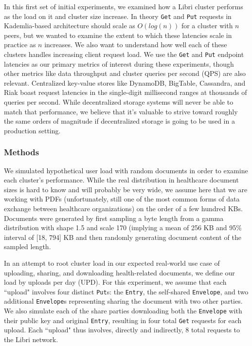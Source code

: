 \documentclass[10pt]{article}
\newcommand{\ttt}[1]{\texttt{#1}}
\def\Entry{\ttt{Entry}}
\def\Envelope{\ttt{Envelope}}
\begin{document}
In this first set of initial experiments, we examined how a Libri cluster performs as the load on it and cluster size increase. In theory \ttt{Get} and \texttt{Put} requests in Kademlia-based architecture should scale as $O(log(n))$ for a cluster with $n$ peers, but we wanted to examine the extent to which these latencies scale in practice as $n$ increases. We also want to understand how well each of these clusters handles increasing client request load. We use the \texttt{Get} and \texttt{Put} endpoint latencies as our primary metrics of interest during these experiments, though other metrics like data throughput and cluster queries per second (QPS) are also relevant. Centralized key-value stores like DynamoDB, BigTable, Cassandra, and Riak boast request latencies in the single-digit millisecond ranges at thousands of queries per second. While decentralized storage systems will never be able to match that performance, we believe that it's valuable to strive toward roughly the same orders of magnitude if decentralized storage is going to be used in a production setting. 

\subsubsection{Methods}
We simulated hypothetical user load with random documents in order to examine each cluster's performance. While the real distribution in healthcare document sizes is hard to know and will probably be very wide, we assume here that we are working with PDFs (unfortunately, still one of the most common forms of data exchange between healthcare organizations) on the order of a few hundred KBs. Documents were generated by first sampling a byte length from a gamma distribution with shape 1.5 and scale 170 (implying a mean of 256 KB and 95\% interval of [18, 794] KB and then randomly generating document content of the sampled length.

In an attempt to root cluster load in our expected real-world use case of uploading, sharing, and downloading health-related documents, we define our load by uploads per day (UPD). For this experiment, we assume that each ``upload" involves four distinct \ttt{Put}s: the \Entry{}, the self-shared \Envelope{}, and two additional \Envelope{}s representing sharing the document with two other parties. We also simulate each of the share parties downloading both the \Envelope{} with their public key and original \Entry{}, resulting in four total \texttt{Get} requests for each upload. Each ``upload" thus involves, directly and indirectly, 8 total requests to the Libri network. 
\end{document}
